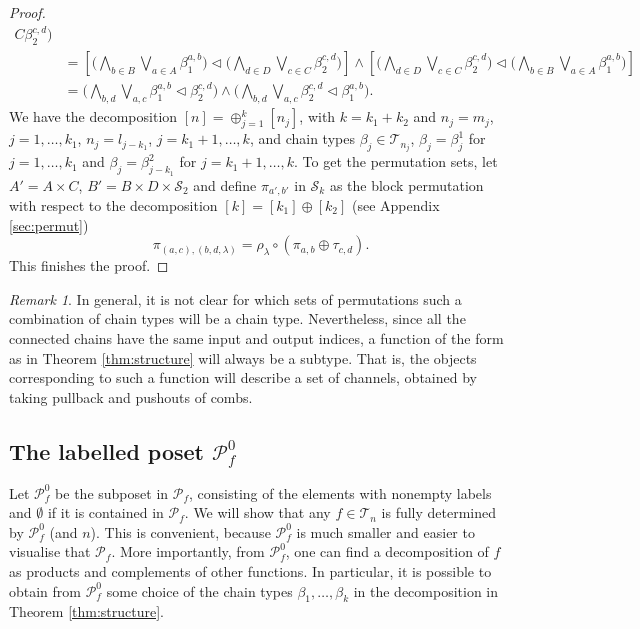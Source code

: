 \documentclass[12pt]{article}
\theoremstyle{definition}
\theoremstyle{remark}
\newtheorem{remark}{Remark}
\def\Te{\mathcal T}
\def\Pe{\mathcal P}
\def\permut{\mathscr{S}}
\def\vtl{\vartriangleleft}
\begin{document}
\begin{proof}
\begin{align*}
{C}\beta_2^{c,d}\bigr)\\
&=\left[\bigl(\bigwedge_{b\in B}\bigvee_{a\in A}\beta_1^{a,b}\bigr)\vtl \bigl(\bigwedge_{d\in D}\bigvee_{c\in
C}\beta_2^{c,d}\bigr)\right]\wedge \left[\bigl(\bigwedge_{d\in D}\bigvee_{c\in
C}\beta_2^{c,d}\bigr)\vtl\bigl(\bigwedge_{b\in B}\bigvee_{a\in A}\beta_1^{a,b}\bigr)
\right]\\
&= \bigl(\bigwedge_{b,d}\bigvee_{a,c} \beta_1^{a,b}\vtl \beta_2^{c,d}\bigr) \wedge
\bigl(\bigwedge_{b,d}\bigvee_{a,c} \beta_2^{c,d}\vtl \beta_1^{a,b}\bigr).
\end{align*}
We have the decomposition $[n]=\oplus_{j=1}^k[n_j]$, with $k=k_1+k_2$ and $n_j=m_j$,
$j=1,\dots, k_1$,  $n_j=l_{j-k_1}$, $j=k_1+1,\dots,k$, and chain types $\beta_j\in
\Te_{n_j}$, $\beta_j=\beta_j^1$ for $j=1,\dots,k_1$ and $\beta_j=\beta^2_{j-k_1}$ for
$j=k_1+1,\dots,k$. To get the permutation sets, let $A'=A\times C$, $B'=B\times D\times
\permut_2$ and define $\pi_{a',b'}$ in $\permut_k$ as the block permutation with respect to the
decomposition $[k]=[k_1]\oplus[k_2]$ (see Appendix \ref{sec:permut})
\[
\pi_{(a,c),(b,d,\lambda)}=\rho_\lambda\circ(\pi_{a,b}\oplus \tau_{c,d}).
\]
This  finishes the proof.

\end{proof}


\begin{remark} In general, it is not clear for which sets of permutations such a
combination of chain types will be a chain type. Nevertheless, since all the connected
chains have the same input and output indices, a function of the form as in Theorem
\ref{thm:structure} will always be a subtype. That is, the objects corresponding to such a
function will describe a set of channels, obtained by taking pullback and pushouts of
combs.

\end{remark}

\subsection{The labelled poset $\Pe_f^0$}

Let $\Pe_f^0$ be the subposet in $\Pe_f$, consisting of the elements with nonempty labels
and $\emptyset$ if it is contained in $\Pe_f$. We will show that any $f\in \Te_n$ is fully determined by $\Pe_f^0$ (and
$n$). This is convenient, because $\Pe_f^0$ is much smaller and easier to visualise that $\Pe_f$. More
importantly, from $\Pe_f^0$, one can find a  decomposition of $f$ as products and complements
of other functions. In particular, it is possible to obtain from $\Pe_f^0$ some choice of
the chain types  $\beta_1,\dots,\beta_k$
in the decomposition in Theorem \ref{thm:structure}.
\end{document}
